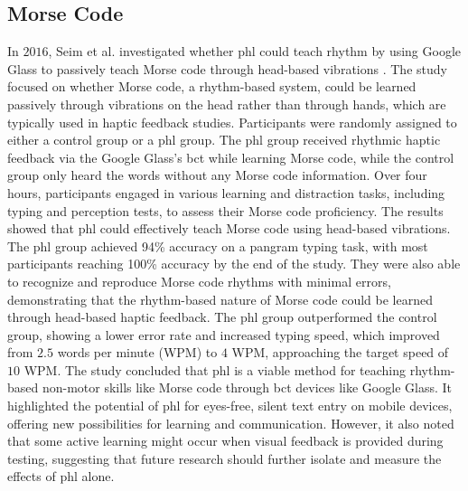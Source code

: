 \subsection{Morse Code}

In $2016$, Seim et al. investigated whether \gls{phl} could teach rhythm by using Google Glass to passively teach Morse code through head-based vibrations \cite{Seim2016a}. The study focused on whether Morse code, a rhythm-based system, could be learned passively through vibrations on the head rather than through hands, which are typically used in haptic feedback studies.
Participants were randomly assigned to either a control group or a \gls{phl} group. The \gls{phl} group received rhythmic haptic feedback via the Google Glass's \gls{bct} while learning Morse code, while the control group only heard the words without any Morse code information. Over four hours, participants engaged in various learning and distraction tasks, including typing and perception tests, to assess their Morse code proficiency.
The results showed that \gls{phl} could effectively teach Morse code using head-based vibrations. The \gls{phl} group achieved 94\% accuracy on a pangram typing task, with most participants reaching 100\% accuracy by the end of the study. They were also able to recognize and reproduce Morse code rhythms with minimal errors, demonstrating that the rhythm-based nature of Morse code could be learned through head-based haptic feedback. The \gls{phl} group outperformed the control group, showing a lower error rate and increased typing speed, which improved from $2.5$ words per minute (WPM) to $4$ WPM, approaching the target speed of $10$ WPM.
The study concluded that \gls{phl} is a viable method for teaching rhythm-based non-motor skills like Morse code through \gls{bct} devices like Google Glass. It highlighted the potential of \gls{phl} for eyes-free, silent text entry on mobile devices, offering new possibilities for learning and communication. However, it also noted that some active learning might occur when visual feedback is provided during testing, suggesting that future research should further isolate and measure the effects of \gls{phl} alone.


